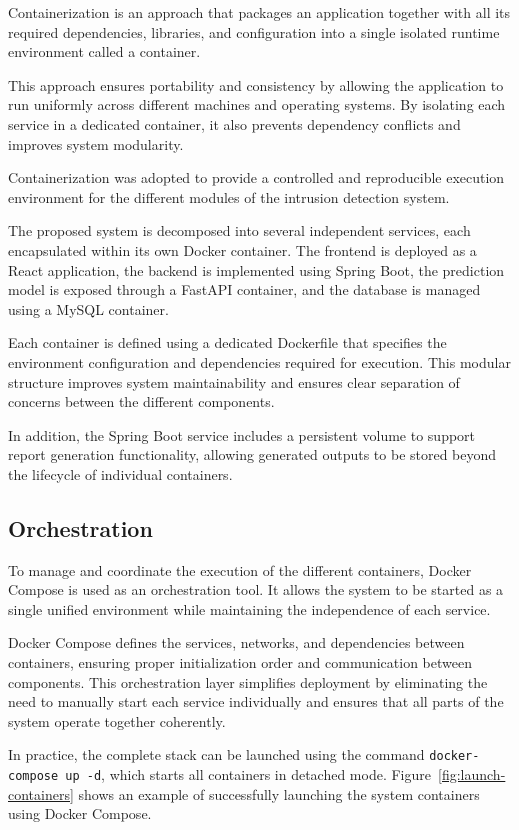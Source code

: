 Containerization is an approach that packages an application together with all its required dependencies, libraries, and configuration into a single isolated runtime environment called a container.

This approach ensures portability and consistency by allowing the application to run uniformly across different machines and operating systems. By isolating each service in a dedicated container, it also prevents dependency conflicts and improves system modularity.

Containerization was adopted to provide a controlled and reproducible execution environment for the different modules of the intrusion detection system.

The proposed system is decomposed into several independent services, each encapsulated within its own Docker container. The frontend is deployed as a React application, the backend is implemented using Spring Boot, the prediction model is exposed through a FastAPI container, and the database is managed using a MySQL container.

Each container is defined using a dedicated Dockerfile that specifies the environment configuration and dependencies required for execution. This modular structure improves system maintainability and ensures clear separation of concerns between the different components.

In addition, the Spring Boot service includes a persistent volume to support report generation functionality, allowing generated outputs to be stored beyond the lifecycle of individual containers.

\subsection{Orchestration}

To manage and coordinate the execution of the different containers, Docker Compose is used as an orchestration tool. It allows the system to be started as a single unified environment while maintaining the independence of each service.

Docker Compose defines the services, networks, and dependencies between containers, ensuring proper initialization order and communication between components.
This orchestration layer simplifies deployment by eliminating the need to manually start each service individually and ensures that all parts of the system operate together coherently.

In practice, the complete stack can be launched using the command \texttt{docker-compose up -d}, which starts all containers in detached mode.
Figure~\ref{fig:launch-containers} shows an example of successfully launching the system containers using Docker Compose.

